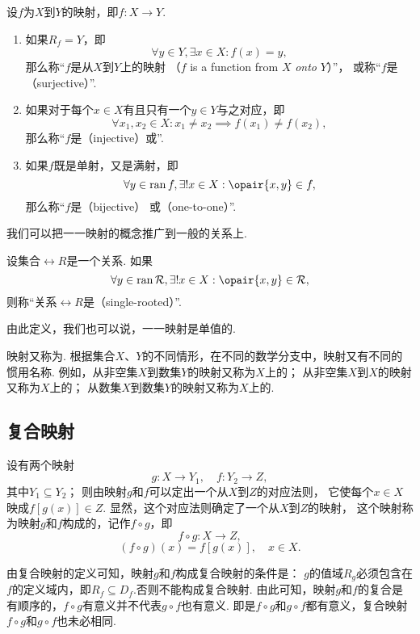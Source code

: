 \begin{definition}
	设\(f\)为\(X\)到\(Y\)的映射，即\(f\colon X \to Y\).
	\begin{enumerate}
		\item 如果\(R_f = Y\)，即\[
			\forall y \in Y, \exists x \in X:
			f(x) = y,
		\]
		那么称“\(f\)是从\(X\)到\(Y\)上的映射%
		（\(f\) is a function from \(X\) \emph{onto} \(Y\)）”，
		或称“\(f\)是（surjective）”.

		\item 如果对于每个\(x \in X\)有且只有一个\(y \in Y\)与之对应，即\[
			\forall x_1, x_2 \in X:
			x_1 \neq x_2
			\implies
			f(x_1) \neq f(x_2),
		\]
		那么称“\(f\)是（injective）或”.

		\item 如果\(f\)既是单射，又是满射，即\[
			\forall y \in \ran f,
			\exists! x \in X:
			\opair{x,y} \in f,
		\]
		那么称“\(f\)是（bijective）%
		或（one-to-one）”.
	\end{enumerate}
\end{definition}

我们可以把一一映射的概念推广到一般的关系上.
\begin{definition}
设集合\(\rel{R}\)是一个关系.
如果\[
	\forall y \in \ran \rel{R},
	\exists! x \in X:
	\opair{x,y} \in \rel{R},
\]
则称“关系\(\rel{R}\)是（single-rooted）”.
\end{definition}

由此定义，我们也可以说，一一映射是单值的.

映射又称为.
根据集合\(X\)、\(Y\)的不同情形，在不同的数学分支中，映射又有不同的惯用名称.
例如，从非空集\(X\)到数集\(Y\)的映射又称为\(X\)上的；
从非空集\(X\)到\(X\)的映射又称为\(X\)上的；
从数集\(X\)到数集\(Y\)的映射又称为\(X\)上的.

\subsection{复合映射}
\begin{definition}
设有两个映射\[
g\colon X \to Y_1, \quad f\colon Y_2 \to Z,
\]其中\(Y_1 \subseteq Y_2\)；
则由映射\(g\)和\(f\)可以定出一个从\(X\)到\(Z\)的对应法则，
它使每个\(x \in X\)映成\(f[g(x)] \in Z\).
显然，这个对应法则确定了一个从\(X\)到\(Z\)的映射，
这个映射称为映射\(g\)和\(f\)构成的，记作\(f \circ g\)，即\[
f \circ g: X \to Z,
\]\[
(f \circ g)(x) = f[g(x)], \quad x \in X.
\]

由复合映射的定义可知，映射\(g\)和\(f\)构成复合映射的条件是：
\(g\)的值域\(R_g\)必须包含在\(f\)的定义域内，即\(R_f \subseteq D_f\).否则不能构成复合映射.
由此可知，映射\(g\)和\(f\)的复合是有顺序的，\(f \circ g\)有意义并不代表\(g \circ f\)也有意义.
即是\(f \circ g\)和\(g \circ f\)都有意义，复合映射\(f \circ g\)和\(g \circ f\)也未必相同.
\end{definition}

